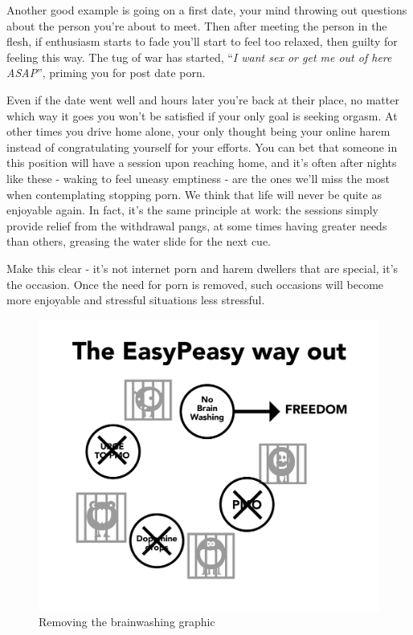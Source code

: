 \documentclass[
]{book}
\begin{document}
Another good example is going on a first date, your mind throwing out questions about the person you're about to meet. Then after meeting the person in the flesh, if enthusiasm starts to fade you'll start to feel too relaxed, then guilty for feeling this way. The tug of war has started, ``\emph{I want sex or get me out of here ASAP}'', priming you for post date porn.

Even if the date went well and hours later you're back at their place, no matter which way it goes you won't be satisfied if your only goal is seeking orgasm. At other times you drive home alone, your only thought being your online harem instead of congratulating yourself for your efforts. You can bet that someone in this position will have a session upon reaching home, and it's often after nights like these - waking to feel uneasy emptiness - are the ones we'll miss the most when contemplating stopping porn. We think that life will never be quite as enjoyable again. In fact, it's the same principle at work: the sessions simply provide relief from the withdrawal pangs, at some times having greater needs than others, greasing the water slide for the next cue.

Make this clear - it's not internet porn and harem dwellers that are special, it's the occasion. Once the need for porn is removed, such occasions will become more enjoyable and stressful situations less stressful.

\begin{figure}
\centering
\includegraphics{images/trap-resolved.png}
\caption{Removing the brainwashing graphic}
\end{figure}
\end{document}
